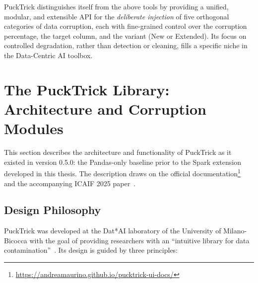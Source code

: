 PuckTrick distinguishes itself from the above tools by providing a unified,
modular, and extensible API for the \emph{deliberate injection} of five
orthogonal categories of data corruption, each with fine-grained control over
the corruption percentage, the target column, and the variant (New or Extended).
Its focus on controlled degradation, rather than detection or cleaning, fills a
specific niche in the Data-Centric AI toolbox.

\section{The PuckTrick Library: Architecture and Corruption Modules}
\label{sec:pucktrick-architecture}

This section describes the architecture and functionality of PuckTrick as it
existed in version 0.5.0: the Pandas-only baseline prior to the Spark extension
developed in this thesis.  The description draws on the official
documentation\footnote{\url{https://andreamaurino.github.io/pucktrick-ui-docs/}}
and the accompanying ICAIF 2025 paper~\cite{icaif2025pucktrick}.

\subsection{Design Philosophy}
\label{sec:pucktrick-philosophy}

PuckTrick was developed at the Dat*AI laboratory of the University of
Milano-Bicocca with the goal of providing researchers with an ``intuitive
library for data contamination''~\cite{icaif2025pucktrick}.  Its design is
guided by three principles:

